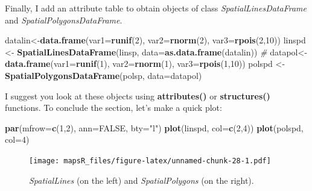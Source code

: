 \documentclass[]{report}
\newenvironment{Shaded}{\begin{snugshade}}{\end{snugshade}}
\newcommand{\KeywordTok}[1]{\textcolor[rgb]{0.13,0.29,0.53}{\textbf{{#1}}}}
\newcommand{\DataTypeTok}[1]{\textcolor[rgb]{0.13,0.29,0.53}{{#1}}}
\newcommand{\DecValTok}[1]{\textcolor[rgb]{0.00,0.00,0.81}{{#1}}}
\newcommand{\StringTok}[1]{\textcolor[rgb]{0.31,0.60,0.02}{{#1}}}
\newcommand{\CommentTok}[1]{\textcolor[rgb]{0.56,0.35,0.01}{\textit{{#1}}}}
\newcommand{\OtherTok}[1]{\textcolor[rgb]{0.56,0.35,0.01}{{#1}}}
\newcommand{\NormalTok}[1]{{#1}}
\begin{document}
Finally, I add an attribute table to obtain objects of class
\emph{SpatialLinesDataFrame} and \emph{SpatialPolygonsDataFrame}.

\begin{Shaded}
\begin{Highlighting}[]
\NormalTok{datalin<-}\KeywordTok{data.frame}\NormalTok{(}\DataTypeTok{var1=}\KeywordTok{runif}\NormalTok{(}\DecValTok{2}\NormalTok{), }\DataTypeTok{var2=}\KeywordTok{rnorm}\NormalTok{(}\DecValTok{2}\NormalTok{), }\DataTypeTok{var3=}\KeywordTok{rpois}\NormalTok{(}\DecValTok{2}\NormalTok{,}\DecValTok{10}\NormalTok{))}
\NormalTok{linspd <-}\StringTok{ }\KeywordTok{SpatialLinesDataFrame}\NormalTok{(linsp, }\DataTypeTok{data=}\KeywordTok{as.data.frame}\NormalTok{(datalin))}
\CommentTok{#}
\NormalTok{datapol<-}\KeywordTok{data.frame}\NormalTok{(}\DataTypeTok{var1=}\KeywordTok{runif}\NormalTok{(}\DecValTok{1}\NormalTok{), }\DataTypeTok{var2=}\KeywordTok{rnorm}\NormalTok{(}\DecValTok{1}\NormalTok{), }\DataTypeTok{var3=}\KeywordTok{rpois}\NormalTok{(}\DecValTok{1}\NormalTok{,}\DecValTok{10}\NormalTok{))}
\NormalTok{polspd <-}\StringTok{ }\KeywordTok{SpatialPolygonsDataFrame}\NormalTok{(polsp, }\DataTypeTok{data=}\NormalTok{datapol)}
\end{Highlighting}
\end{Shaded}

I suggest you look at these objects using \textbf{attributes()} or
\textbf{structures()} functions. To conclude the section, let's make a
quick plot:

\begin{Shaded}
\begin{Highlighting}[]
\KeywordTok{par}\NormalTok{(}\DataTypeTok{mfrow=}\KeywordTok{c}\NormalTok{(}\DecValTok{1}\NormalTok{,}\DecValTok{2}\NormalTok{), }\DataTypeTok{ann=}\OtherTok{FALSE}\NormalTok{, }\DataTypeTok{bty=}\StringTok{"l"}\NormalTok{)}
\KeywordTok{plot}\NormalTok{(linspd, }\DataTypeTok{col=}\KeywordTok{c}\NormalTok{(}\DecValTok{2}\NormalTok{,}\DecValTok{4}\NormalTok{))}
\KeywordTok{plot}\NormalTok{(polspd, }\DataTypeTok{col=}\DecValTok{4}\NormalTok{)}
\end{Highlighting}
\end{Shaded}

\begin{figure}[htbp]
\centering
\texttt{[image: mapsR\_files/figure-latex/unnamed-chunk-28-1.pdf]}
\caption{\emph{SpatialLines} (on the left) and \emph{SpatialPolygons}
(on the right).}
\end{figure}
\end{document}
